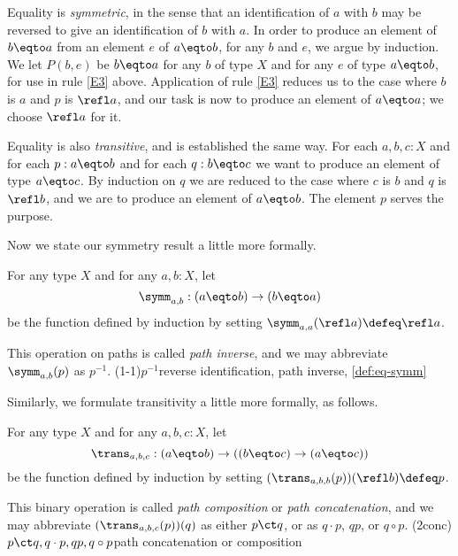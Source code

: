 Equality is \emph{symmetric}, in the sense that an identification of $a$ with $b$ may be reversed to give an identification of $b$ with $a$.  In
order to produce an element of $b \eqto a$ from an element $e$ of $a \eqto b$, for any $b$ and $e$, we argue by induction.  We let $P(b,e)$ be $b \eqto a$ for any 
$b$ of type $X$ and for any $e$ of type $a \eqto b$, for use in rule \ref{E3} above.
Application of rule \ref{E3} reduces us to the case where $b$ is $a$ and $p$ is $\refl a$, and
our task is now to produce an element of $a \eqto a$; we choose $\refl a$ for it.

Equality is also \emph{transitive}, and is established the same way.
For each $a,b,c:X$ and for each $p:a \eqto b$ and for each $q:b \eqto c$ we want to produce an
element of type $a \eqto c$.  By induction on $q$ we are reduced to the case where $c$ is $b$ and $q$ is $\refl b$, and we are to produce an element
of $a \eqto b$.  The element $p$ serves the purpose.

Now we state our symmetry result a little more formally.

\begin{definition}\label{def:eq-symm}
  For any type $X$ and for any $a,b:X$, let $$\symm_{a,b} : (a \eqto b) \to (b \eqto a)$$
  be the function defined by induction by setting
  $\symm_{a,a}(\refl a) \defeq \refl a$.

  This operation on paths is called \emph{path inverse}, and we may abbreviate $\symm_{a,b}(p)$ as $p^{-1}$.
  \glossary(1-1){$p^{-1}$}{reverse identification, path inverse, \cref{def:eq-symm}}
\end{definition}

Similarly, we formulate transitivity a little more formally, as follows.

\begin{definition}\label{def:eq-trans}
  For any type $X$ and for any $a,b,c:X$, let $$\trans_{a,b,c} : (a \eqto b) \to ((b \eqto c) \to (a \eqto c))$$ be the function defined by induction by setting
  $(\trans_{a,b,b} (p)) (\refl b ) \defeq p$.

  This binary operation is called \emph{path composition} or \emph{path concatenation},
  and we may abbreviate $(\trans_{a,b,c}(p))(q)$ as either $p \ct q$, or as $q \cdot p$, $qp$, or $q \circ p$.
  \glossary(2conc){$p\protect\ct q, q\cdot p, qp, q\circ p$}{path concatenation or composition}
\end{definition}

